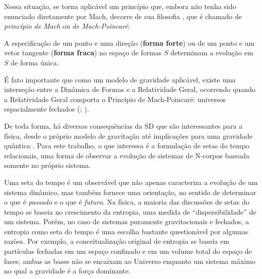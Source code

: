Nessa situação, se torna aplicável um princípio que, embora não tenha sido enunciado diretamente por Mach, decorre de sua filosofia \citep[139]{Assis:1998}, que é chamado de \textit{princípio de Mach} ou \textit{de Mach-Poincaré}:

\begin{definition}
    A especificação de um ponto e uma direção (\textbf{forma forte}) ou de um ponto e um vetor tangente (\textbf{forma fraca}) no espaço de formas $S$ determinam a evolução em $S$ de forma única. \citep[31]{Barbour2014_kepler_mach}
\end{definition}

É fato importante que como um modelo de gravidade aplicável, existe uma interseção entre a Dinâmica de Formas e a Relatividade Geral, ocorrendo quando a Relatividade Geral comporta o Princípio de Mach-Poincaré: universos espacialmente fechados (\citealp[157]{Einstein:1981}; \citealp[258]{Barbour2012_sd_introduction}).

De toda forma, há diversas consequências da SD que são interessantes para a física, desde o próprio modelo de gravitação até implicações para uma gravidade quântica \citep{Barbour2012_sd_introduction}. Para este trabalho, o que interessa é a formulação de setas do tempo relacionais, uma forma de observar a evolução de sistemas de N-corpos baseada somente no próprio sistema.

Uma seta do tempo é um observável que não apenas caracteriza a evolução de um sistema dinâmico, mas também fornece uma orientação, no sentido de determinar o que é \textit{passado} e o que é \textit{futuro}. Na física, a maioria das discussões de setas do tempo se baseia no crescimento da entropia, uma medida de ``dispersibilidade'' de um sistema. Porém, no caso de sistemas puramente gravitacionais e fechados, a entropia como seta do tempo é uma escolha bastante questionável por algumas razões. Por exemplo, a conceitualização original de entropia se baseia em partículas fechadas em um espaço confinado e em um volume total do espaço de fases; ambas as bases não se encaixam ao Universo enquanto um sistema máximo no qual a gravidade é a força dominante.


